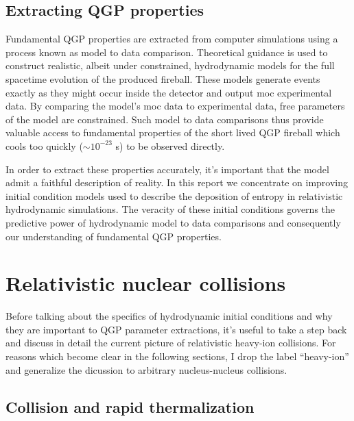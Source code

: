 \documentclass[aps,prc,reprint,amsmath,nofootinbib]{revtex4-1}
\begin{document}
\subsection{Extracting QGP properties}

Fundamental QGP properties are extracted from computer simulations using a process known as model to data comparison. Theoretical guidance is used to construct
realistic, albeit under constrained, hydrodynamic models for the full spacetime evolution of the produced fireball. These models generate events exactly as they might
occur inside the detector and output moc experimental data. By comparing the model's moc data to experimental data, free parameters of the model are constrained. Such 
model to data comparisons thus provide valuable access to fundamental properties of the short lived QGP fireball which cools too quickly (${\sim}10^{-23}$ s) to be 
observed directly.

In order to extract these properties accurately, it's important that the model admit a faithful description of reality. In this report we concentrate on improving 
initial condition models used to describe the deposition of entropy in relativistic hydrodynamic simulations. The veracity of these initial conditions governs the 
predictive power of hydrodynamic model to data comparisons and consequently our understanding of fundamental QGP properties.
  
\section{Relativistic nuclear collisions}

Before talking about the specifics of hydrodynamic initial conditions and why they are important to QGP parameter extractions, it's useful to take a step back 
and discuss in detail the current picture of relativistic heavy-ion collisions. For reasons which become clear in the following sections, I drop the 
label ``heavy-ion'' and generalize the dicussion to arbitrary nucleus-nucleus collisions.

\subsection{Collision and rapid thermalization}
\end{document}
